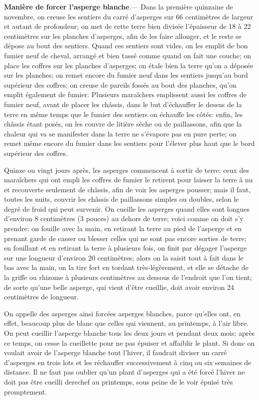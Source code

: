 \documentclass[10pt,a4paper]{book}
\begin{document}
\textbf{Manière de forcer l'asperge blanche}.--- Dans la première quinzaine de novembre, on creuse les sentiers du carré d'asperges sur 66 centimètres de largeur et autant de profondeur; on met de cette terre bien divisée l'épaisseur de 18 à 22 centimètres sur les planches d'asperges, afin de les faire allonger, et le reste se dépose au bout des sentiers. Quand ces sentiers sont vides, on les emplit de bon fumier neuf de cheval, arrangé et bien tassé comme quand on fait une couche; on place les coffres sur les planches d'asperges; on étale bien la terre qu'on a déposée sur les planches; on remet encore du fumier neuf dans les sentiers jusqu'au bord supérieur des coffres; on creuse de pareils fossés au bout des planches, qu'on emplit également de fumier. Plusieurs maraîchers emplissent aussi les coffres de fumier neuf, avant de placer les châssis, dans le but d'échauffer le dessus de la terre en même temps que le fumier des sentiers on échauffe les côtés: enfin, les châssis étant posés, on les couvre de litière sèche ou de paillassons, afin que la chaleur qui va se manifester dans la terre ne s'évapore pas en pure perte; on remet même encore du fumier dans les sentiers pour l'élever plus haut que le bord supérieur des coffres.

Quinze ou vingt jours après, les asperges commencent à sortir de terre; ceux des maraîchers qui ont empli les coffres de fumier le retirent pour laisser la terre à nu et recouverte seulement de châssis, afin de voir les asperges pousser; mais il faut, toutes les nuits, couvrir les châssis de paillassons simples ou doubles, selon le degré de froid qui peut survenir. On cueille les asperges quand elles sont longues d'environ 8 centimètres (3 pouces) au dehors de terre; voici comme on doit s'y prendre: on fouille avec la main, en retirant la terre au pied de l'asperge et en prenant garde de casser ou blesser celles qui ne sont pas encore sorties de terre; en fouillant et en retirant la terre à plusieurs fois, on finit par dégager l'asperge sur une longueur d'environ 20 centimètres; alors on la saisit tout à fait dans le bas avec la main, on la tire fort en tordant très-légèrement, et elle se détache de la griffe ou rhizome à plusieurs centimètres au dessous de l'endroit que l'on tient; de sorte qu'une belle asperge, qui vient d'être cueillie, doit avoir environ 24 centimètres de longueur.

On appelle des asperges ainsi forcées asperges blanches, parce qu'elles ont, en effet, beaucoup plus de blanc que celles qui viennent, au printemps, à l'air libre. On peut cueillir l'asperge blanche tous les deux jours et pendant deux mois; après ce temps, on cesse la cueillette pour ne pas épuiser et affaiblir le plant. Si donc on voulait avoir de l'asperge blanche tout l'hiver, il faudrait diviser un carré d'asperges en trois lots et les réchauffer successivement à cinq ou six semaines de distance. Il ne faut pas oublier qu'un plant d'asperges qui a été forcé l'hiver ne doit pas être cueilli derechef au printemps, sous peine de le voir épuisé très promptement.
\end{document}
